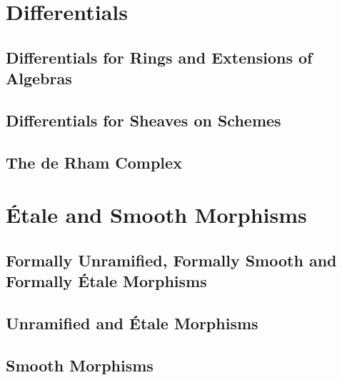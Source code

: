 \documentclass[11pt, a4paper]{article}
\title{\notestitle}
\author{\notesauthor}
\date{\notesdate}
\begin{document}
\maketitle
\tableofcontents
\newpage

\section{Differentials}

\subsection{Differentials for Rings and Extensions of Algebras}

\subsection{Differentials for Sheaves on Schemes}

\subsection{The de Rham Complex}

\section{\'Etale and Smooth Morphisms}

\subsection{Formally Unramified, Formally Smooth and Formally \'Etale Morphisms}

\subsection{Unramified and \'Etale Morphisms}

\subsection{Smooth Morphisms}

\end{document}
